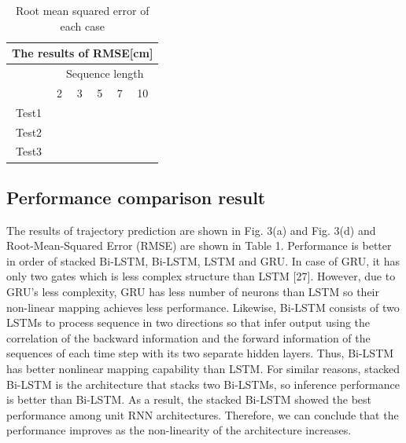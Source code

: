 \documentclass{ieeeaccess}
\begin{document}
\begin{table}[h]
	\centering
	\caption{Root mean squared error of each case}
	\begin{tabular}{clllll}
		\toprule
		\multicolumn{6}{c}{The results of RMSE[cm]}                         \\
		\midrule
		& \multicolumn{5}{c}{Sequence length} \\  \cmidrule{2-6}
		
		\multicolumn{1}{l}{} & 2   & 3   & 5  & 7  & 10  \\
		Test1                &     &     &    &    &     \\
		Test2                &     &     &    &    &     \\
		Test3                &     &     &    &    &    \\
		\bottomrule 
		
	\end{tabular}
	\label{table:RMSE_sequence}
\end{table}

\subsection{Performance comparison result}

The results of trajectory prediction are shown in Fig. 3(a) and Fig. 3(d) and
Root-Mean-Squared Error (RMSE) are shown in Table 1. Performance is better
in order of stacked Bi-LSTM, Bi-LSTM, LSTM and GRU. In case of GRU, it
has only two gates which is less complex structure than LSTM [27]. However,
due to GRU's less complexity, GRU has less number of neurons than LSTM so
their non-linear mapping achieves less performance. Likewise, Bi-LSTM consists
of two LSTMs to process sequence in two directions so that infer output using
the correlation of the backward information and the forward information of the
sequences of each time step with its two separate hidden layers. Thus, Bi-LSTM
has better nonlinear mapping capability than LSTM. For similar reasons, stacked
Bi-LSTM is the architecture that stacks two Bi-LSTMs, so inference performance
is better than Bi-LSTM. As a result, the stacked Bi-LSTM showed the best
performance among unit RNN architectures. Therefore, we can conclude that
the performance improves as the non-linearity of the architecture increases.
\end{document}
